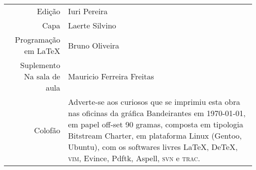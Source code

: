 
\newcommand{\putline}[2]{#1 & #2\\}

%
\ifodd\thepage\paginabranca\else\clearpage\fi
\pagebreak
\thispagestyle{empty}

\noindent\begin{tabular}{rp{}}\small
    \putline{Edição}{Iuri Pereira}
		\putline{Capa}{Laerte Silvino}
		\putline{Programação em \LaTeX}{Bruno Oliveira}
		\putline{Suplemento Na sala de aula}{Mauricio Ferreira Freitas}
		\putline{Colofão}{Adverte-se aos curiosos que se
			imprimiu esta obra nas oficinas da gráfica
			Bandeirantes em \today, em papel 
			\mbox{off-set} 90 gramas,
			composta em tipologia Bitstream Charter, 
			em plataforma Linux (Gentoo, Ubuntu), 
			com os softwares livres 
			\LaTeX, De\TeX, \textsc{vim}, Evince, Pdftk, 
			Aspell, \textsc{svn} e \textsc{trac}.}
\end{tabular}

